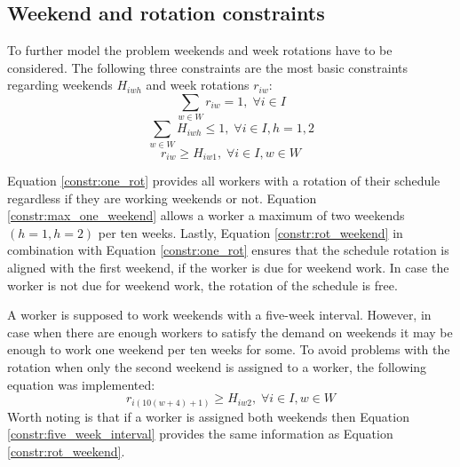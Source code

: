 \subsection{Weekend and rotation constraints} \label{section:weekend_rot_constraints}
To further model the problem weekends and week rotations have to be considered. The following three constraints are the most basic constraints regarding weekends $H_{iwh}$ and week rotations $r_{iw}$:
\begin{equation} \label{constr:one_rot}
\sum_{w \in W} r_{iw} = 1, \; \forall i\in I
\end{equation}
\begin{equation} \label{constr:max_one_weekend}
\sum_{w \in W} H_{iwh} \leq 1, \; \forall i\in I, h = 1,2
\end{equation}
\begin{equation} \label{constr:rot_weekend}
r_{iw} \geq H_{iw1}, \; \forall i\in I, w \in W
\end{equation}

Equation \ref{constr:one_rot} provides all workers with a rotation of their schedule regardless if they are working weekends or not. Equation \ref{constr:max_one_weekend} allows a worker a maximum of two weekends $(h = 1, h = 2)$ per ten weeks. Lastly, Equation \ref{constr:rot_weekend} in combination with Equation \ref{constr:one_rot} ensures that the schedule rotation is aligned with the first weekend, if the worker is due for weekend work. In case the worker is not due for weekend work, the rotation of the schedule is free.

A worker is supposed to work weekends with a five-week interval. However, in case when there are enough workers to satisfy the demand on weekends it may be enough to work one weekend per ten weeks for some. To avoid problems with the rotation when only the second weekend is assigned to a worker, the following equation was implemented:
\begin{equation} \label{constr:five_week_interval}
r_{i({10}(w+4)+1)} \geq H_{iw2}, \; \forall i\in I, w \in W
\end{equation}
Worth noting is that if a worker is assigned both weekends then Equation \ref{constr:five_week_interval} provides the same information as Equation \ref{constr:rot_weekend}.

